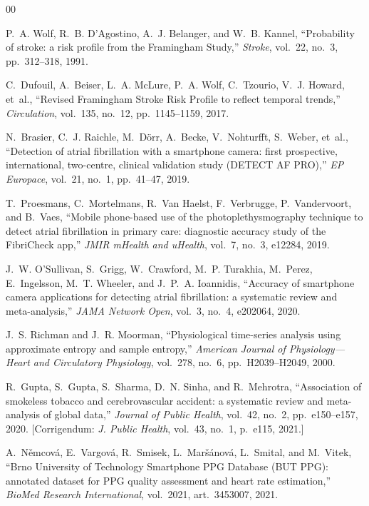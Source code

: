 \documentclass[conference]{IEEEtran}
\begin{document}
\begin{thebibliography}{00}

P.~A. Wolf, R.~B. D'Agostino, A.~J. Belanger, and W.~B. Kannel,
``Probability of stroke: a risk profile from the Framingham Study,''
\emph{Stroke}, vol.~22, no.~3, pp.~312--318, 1991.

C.~Dufouil, A.~Beiser, L.~A. McLure, P.~A. Wolf, C.~Tzourio, V.~J. Howard,
et~al.,
``Revised Framingham Stroke Risk Profile to reflect temporal trends,''
\emph{Circulation}, vol.~135, no.~12, pp.~1145--1159, 2017.

N.~Brasier, C.~J. Raichle, M.~Dörr, A.~Becke, V.~Nohturfft, S.~Weber, et~al.,
``Detection of atrial fibrillation with a smartphone camera: first prospective,
international, two-centre, clinical validation study (DETECT AF PRO),''
\emph{EP Europace}, vol.~21, no.~1, pp.~41--47, 2019.

T.~Proesmans, C.~Mortelmans, R.~Van Haelst, F.~Verbrugge, P.~Vandervoort, and
B.~Vaes,
``Mobile phone-based use of the photoplethysmography technique to detect atrial
fibrillation in primary care: diagnostic accuracy study of the FibriCheck app,''
\emph{JMIR mHealth and uHealth}, vol.~7, no.~3, e12284, 2019.

J.~W. O'Sullivan, S.~Grigg, W.~Crawford, M.~P. Turakhia, M.~Perez,
E.~Ingelsson, M.~T. Wheeler, and J.~P.~A. Ioannidis,
``Accuracy of smartphone camera applications for detecting atrial fibrillation: a
systematic review and meta-analysis,''
\emph{JAMA Network Open}, vol.~3, no.~4, e202064, 2020.

J.~S. Richman and J.~R. Moorman,
``Physiological time-series analysis using approximate entropy and sample
entropy,''
\emph{American Journal of Physiology---Heart and Circulatory Physiology},
vol.~278, no.~6, pp.~H2039--H2049, 2000.

R.~Gupta, S.~Gupta, S.~Sharma, D.~N. Sinha, and R.~Mehrotra,
``Association of smokeless tobacco and cerebrovascular accident: a systematic
review and meta-analysis of global data,''
\emph{Journal of Public Health}, vol.~42, no.~2, pp.~e150--e157, 2020.
[Corrigendum: \emph{J. Public Health}, vol.~43, no.~1, p.~e115, 2021.]

A.~N\v{e}mcov\'a, E.~Vargov\'a, R.~Smisek, L.~Mar\v{s}\'anov\'a,
L.~Smital, and M.~Vitek,
``Brno University of Technology Smartphone PPG Database (BUT PPG): annotated
dataset for PPG quality assessment and heart rate estimation,''
\emph{BioMed Research International}, vol.~2021, art.~3453007, 2021.


\end{thebibliography}
\end{document}
